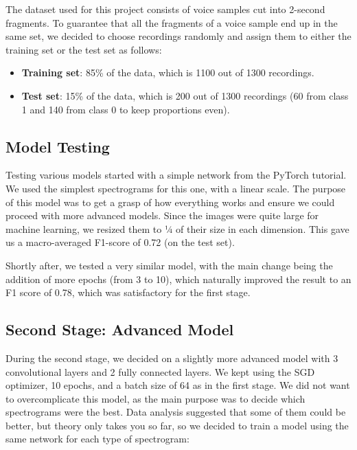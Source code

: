 \documentclass[11pt, letterpaper]{article}
\begin{document}
The dataset used for this project consists of voice samples cut into 2-second fragments. To guarantee that all the fragments of a voice sample end up in the same set, we decided to choose recordings randomly and assign them to either the training set or the test set as follows:

\begin{itemize}
    \item \textbf{Training set}: 85\% of the data, which is 1100 out of 1300 recordings.
    \item \textbf{Test set}: 15\% of the data, which is 200 out of 1300 recordings (60 from class 1 and 140 from class 0 to keep proportions even).
\end{itemize}

\subsection{Model Testing}

Testing various models started with a simple network from the PyTorch tutorial. We used the simplest spectrograms for this one, with a linear scale. The purpose of this model was to get a grasp of how everything works and ensure we could proceed with more advanced models. Since the images were quite large for machine learning, we resized them to ¼ of their size in each dimension. This gave us a macro-averaged F1-score of 0.72 (on the test set).

Shortly after, we tested a very similar model, with the main change being the addition of more epochs (from 3 to 10), which naturally improved the result to an F1 score of 0.78, which was satisfactory for the first stage.

\subsection{Second Stage: Advanced Model}

During the second stage, we decided on a slightly more advanced model with 3 convolutional layers and 2 fully connected layers. We kept using the SGD optimizer, 10 epochs, and a batch size of 64 as in the first stage. We did not want to overcomplicate this model, as the main purpose was to decide which spectrograms were the best. Data analysis suggested that some of them could be better, but theory only takes you so far, so we decided to train a model using the same network for each type of spectrogram:
\end{document}
